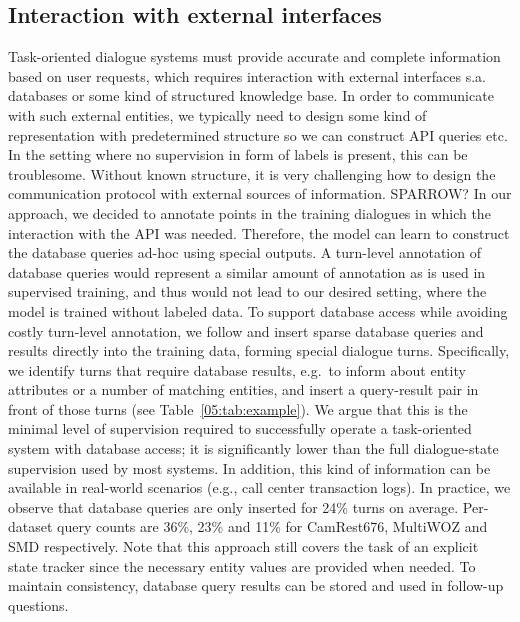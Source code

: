 \subsection{Interaction with external interfaces}
Task-oriented dialogue systems must provide accurate and complete information based on user requests, which requires interaction with external interfaces s.a. databases or some kind of structured knowledge base.
In order to communicate with such external entities, we typically need to design some kind of representation with predetermined  structure so we can construct API queries etc.
In the setting where no supervision in form of labels is present, this can be troublesome.
Without known structure, it is very challenging how to design the communication protocol with external sources of information.
SPARROW?
In our approach, we decided to annotate points in the training dialogues in which the interaction with the API was needed.
Therefore, the model can learn to construct the database queries ad-hoc using special outputs.
A turn-level annotation of database queries would represent a similar amount of annotation as is used in supervised training, and thus would not lead to our desired setting, where the model is trained without labeled data.
To support database access while avoiding costly turn-level annotation, we follow \citet{bordes2016learning} and 
insert sparse database queries and results directly into the training data, forming special dialogue turns.
Specifically, we identify turns that require database results, e.g.\ to inform about entity attributes or a number of matching entities, and insert a query-result pair in front of those turns (see Table~\ref{05:tab:example}). We argue that this is the minimal level of supervision required to successfully operate a task-oriented system with database access; it is significantly lower than the full dialogue-state supervision used by most systems.
In addition, this kind of information can be available in real-world scenarios (e.g., call center transaction logs).
In practice, we observe that database queries are only inserted for 24\% turns on average.
Per-dataset query counts are 36\%, 23\% and 11\% for CamRest676, MultiWOZ and SMD respectively.
Note that this approach still covers the task of an explicit state tracker since the necessary entity values are provided when needed.
To maintain consistency, database query results can be stored and used in follow-up questions.
